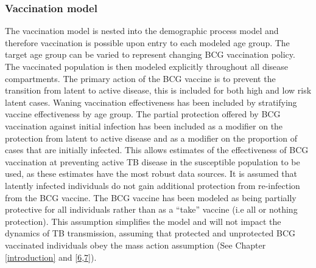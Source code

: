 \documentclass[11pt,twoside]{bristolthesis}
\begin{document}
  \hypertarget{vaccination-model}{%
  \subsubsection{Vaccination model}\label{vaccination-model}}
  
  The vaccination model is nested into the demographic process model and therefore vaccination is possible upon entry to each modeled age group. The target age group can be varied to represent changing BCG vaccination policy. The vaccinated population is then modeled explicitly throughout all disease compartments. The primary action of the BCG vaccine is to prevent the transition from latent to active disease, this is included for both high and low risk latent cases. Waning vaccination effectiveness has been included by stratifying vaccine effectiveness by age group. The partial protection offered by BCG vaccination against initial infection has been included as a modifier on the protection from latent to active disease and as a modifier on the proportion of cases that are initially infected. This allows estimates of the effectiveness of BCG vaccination at preventing active TB disease in the susceptible population to be used, as these estimates have the most robust data sources. It is assumed that latently infected individuals do not gain additional protection from re-infection from the BCG vaccine. The BCG vaccine has been modeled as being partially protective for all individuals rather than as a ``take'' vaccine (i.e all or nothing protection). This assumption simplifies the model and will not impact the dynamics of TB transmission, assuming that protected and unprotected BCG vaccinated individuals obey the mass action assumption (See Chapter \ref{introduction} and {[}\protect\hyperlink{ref-Anderson1991}{6},\protect\hyperlink{ref-Keeling2007}{7}{]}).
\end{document}
